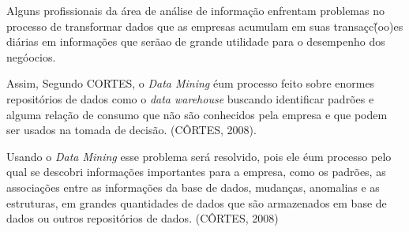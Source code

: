 Alguns profissionais da \'{a}rea de an\'{a}lise de informa\c{c}\~{a}o enfrentam problemas no processo de transformar dados que as empresas acumulam em suas transa\c{c}c\~(oo)es di\'{a}rias em informa\c{c}\~{o}es que ser\~{a}ao de grande utilidade para o desempenho dos neg\'{o}ocios. 

Assim, Segundo CORTES, o \textit{Data Mining} \'{e}um processo feito sobre enormes reposit\'{o}rios de dados como o \textit{data warehouse} buscando identificar padr\~{o}es e alguma rela\c{c}\~{a}o de consumo que n\~{a}o s\~{a}o conhecidos pela empresa e que podem ser usados na tomada de decis\~{a}o. (C\^{O}RTES, 2008).

Usando o \textit{Data Mining} esse problema ser\'{a} resolvido, pois ele \'{e}um processo pelo qual se descobri informa\c{c}\~{o}es importantes para a empresa, como os padr\~{o}es, as associa\c{c}\~{o}es entre as informa\c{c}\~{o}es da base de dados, mudan\c{c}as, anomalias e as estruturas, em grandes quantidades de dados que s\~{a}o armazenados em base de dados ou outros reposit\'{o}rios de dados. (C\^{O}RTES, 2008)
